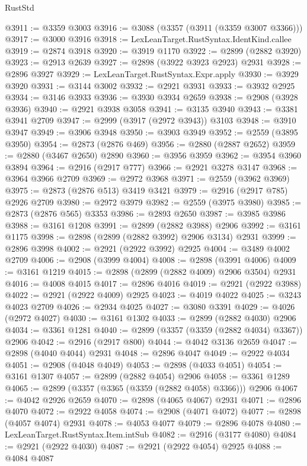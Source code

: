 \begin{lexlean}{RustStd}
\begin{coremodule}
@3911 := @3359 @3003
@3916 := @3088 (@3357 (@3911 (@3359 @3007 @3366)))
@3917 := @3000 @3916
@3918 := LexLeanTarget.RustSyntax.IdentKind.callee
@3919 := @2874 @3918
@3920 := @3919 @1170
@3922 := @2899 (@2882 @3920)
@3923 := @2913 @2639
@3927 := @2898 (@3922 @3923 @2923) @2931
@3928 := @2896 @3927
@3929 := LexLeanTarget.RustSyntax.Expr.apply
@3930 := @3929 @3920
@3931 := @3144 @3002
@3932 := @2921 @3931
@3933 := @3932 @2925
@3934 := @3146 @3933
@3936 := @3930 @3934 @2659
@3938 := @2908 (@3928 @3936)
@3940 := @2921 @3938 @3058
@3941 := @3135 @3940
@3943 := @3381 @3941 @2709
@3947 := @2999 (@3917 (@2972 @3943)) @3103
@3948 := @3910 @3947
@3949 := @3906 @3948
@3950 := @3903 @3949
@3952 := @2559 (@3895 @3950)
@3954 := @2873 (@2876 @469)
@3956 := @2880 (@2887 @2652)
@3959 := @2880 (@3467 @2650) @2890
@3960 := @3956 @3959
@3962 := @3954 @3960 @3894
@3964 := @2916 (@2917 @777)
@3966 := @2921 @3278 @3147
@3968 := @3964 @3966 @2709
@3969 := @2972 @3968
@3971 := @2559 (@3962 @3969)
@3975 := @2873 (@2876 @513) @3419 @3421
@3979 := @2916 (@2917 @785) @2926 @2709
@3980 := @2972 @3979
@3982 := @2559 (@3975 @3980)
@3985 := @2873 (@2876 @565) @3353
@3986 := @2893 @2650
@3987 := @3985 @3986
@3988 := @3161 @1208
@3991 := @2899 (@2882 @3988) @2906
@3992 := @3161 @1175
@3998 := @2898 (@2899 (@2882 @3992) @2906 @3134) @2931
@3999 := @2896 @3998
@4002 := @2921 (@2922 @3992) @2925
@4004 := @3489 @4002 @2709
@4006 := @2908 (@3999 @4004)
@4008 := @2898 (@3991 @4006)
@4009 := @3161 @1219
@4015 := @2898 (@2899 (@2882 @4009) @2906 @3504) @2931
@4016 := @4008 @4015
@4017 := @2896 @4016
@4019 := @2921 (@2922 @3988)
@4022 := @2921 (@2922 @4009) @2925
@4023 := @4019 @4022
@4025 := @3243 @4023 @2709
@4026 := @2934 @4025
@4027 := @3080 @3391
@4029 := @4026 (@2972 @4027)
@4030 := @3161 @1302
@4033 := @2899 (@2882 @4030) @2906
@4034 := @3361 @1281
@4040 := @2899 (@3357 (@3359 (@2882 @4034) @3367)) @2906
@4042 := @2916 (@2917 @800)
@4044 := @4042 @3136 @2659
@4047 := @2898 (@4040 @4044) @2931
@4048 := @2896 @4047
@4049 := @2922 @4034
@4051 := @2908 (@4048 @4049)
@4053 := @2898 (@4033 @4051)
@4054 := @3161 @1307
@4057 := @2899 (@2882 @4054) @2906
@4058 := @3361 @1289
@4065 := @2899 (@3357 (@3365 (@3359 (@2882 @4058) @3366))) @2906
@4067 := @4042 @2926 @2659
@4070 := @2898 (@4065 @4067) @2931
@4071 := @2896 @4070
@4072 := @2922 @4058
@4074 := @2908 (@4071 @4072)
@4077 := @2898 (@4057 @4074) @2931
@4078 := @4053 @4077
@4079 := @2896 @4078
@4080 := LexLeanTarget.RustSyntax.Item.intSub
@4082 := @2916 (@3177 @4080)
@4084 := @2921 (@2922 @4030)
@4087 := @2921 (@2922 @4054) @2925
@4088 := @4084 @4087

\end{coremodule}
\end{lexlean}

